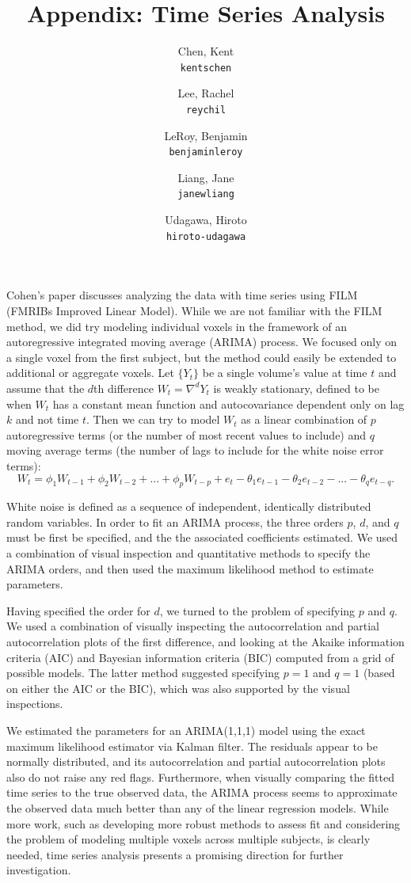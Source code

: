 \documentclass[11pt]{article}
\title{Appendix: Time Series Analysis}
\author{
  Chen, Kent\\
  \texttt{kentschen}
  \and
  Lee, Rachel\\
  \texttt{reychil}
  \and
  LeRoy, Benjamin\\
  \texttt{benjaminleroy}
  \and
  Liang, Jane\\
  \texttt{janewliang}
  \and
  Udagawa, Hiroto\\
  \texttt{hiroto-udagawa}
}
\begin{document}
\maketitle

\par \indent Cohen's paper \cite{CohenSelfControl} discusses analyzing the 
data with time series using FILM (FMRIBs Improved Linear Model). While we are 
not familiar with the FILM method, we did try modeling individual voxels in 
the framework of an autoregressive integrated moving average (ARIMA) process. 
We focused only on a single voxel from the first subject, but the method 
could easily be extended to additional or aggregate voxels. Let $\{Y_t\}$ be 
a single volume's value at time $t$ and assume that the $d$th difference 
$W_t = \nabla^d Y_t$ is weakly stationary, defined to be when $W_t$ has a 
constant mean function and autocovariance dependent only on lag $k$ and not 
time $t$. Then we can try to model $W_t$ as a linear combination of $p$ 
autoregressive terms (or the number of most recent values to include) and $q$ 
moving average terms (the number of lags to include for the white noise error 
terms): 
$$W_t = \phi_1 W_{t-1} + \phi_2 W_{t-2} + ... + \phi_p W_{t-p} + e_t - 
\theta_1 e_{t-1} - \theta_2 e_{t-2} - ... - \theta_q e_{t-q}.$$

\par White noise is defined as a sequence of independent, identically 
distributed random variables. In order to fit an ARIMA process, the three 
orders $p$, $d$, and $q$ must be first be specified, and the the associated 
coefficients estimated. We used a combination of visual inspection and 
quantitative methods to specify the ARIMA orders, and then used the maximum 
likelihood method to estimate parameters. 

\par Having specified the order for $d$, we turned to the problem of 
specifying $p$ and $q$. We used a combination of visually inspecting the 
autocorrelation and partial autocorrelation plots of the first difference, 
and looking at the Akaike information criteria (AIC) and Bayesian information 
criteria (BIC) computed from a grid of possible models. The latter method 
suggested specifying $p=1$ and $q=1$ (based on either the AIC or the BIC), 
which was also supported by the visual inspections. 

\par We estimated the parameters for an ARIMA(1,1,1) model using the exact 
maximum likelihood estimator via Kalman filter. The residuals appear to be 
normally distributed, and its autocorrelation and partial autocorrelation 
plots also do not raise any red flags. Furthermore, when visually comparing 
the fitted time series to the true observed data, the ARIMA process seems to 
approximate the observed data much better than any of the linear regression 
models. While more work, such as developing more robust methods to assess fit 
and considering the problem of modeling multiple voxels across multiple 
subjects, is clearly needed, time series analysis presents a promising 
direction for further investigation. 
\end{document}
